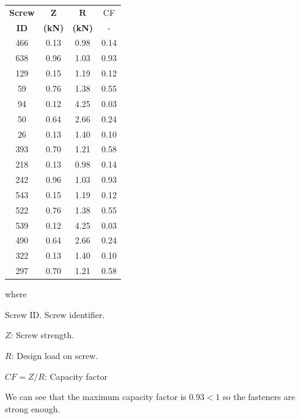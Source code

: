 \begin{center}
  \begin{tabular}{|c|c|c|c|}
    \hline
    \textbf{Screw} & $\mathbf{Z}$ & $\mathbf{R}$ & CF    \\
    \textbf{ID} & \textbf{(kN)}& \textbf{(kN)} & - \\
      \hline
466 & 0.13 & 0.98 & 0.14\\
638 & 0.96 & 1.03 & 0.93\\
129 & 0.15 & 1.19 & 0.12\\
59 & 0.76 & 1.38 & 0.55\\
94 & 0.12 & 4.25 & 0.03\\
50 & 0.64 & 2.66 & 0.24\\
26 & 0.13 & 1.40 & 0.10\\
393 & 0.70 & 1.21 & 0.58\\
218 & 0.13 & 0.98 & 0.14\\
242 & 0.96 & 1.03 & 0.93\\
543 & 0.15 & 1.19 & 0.12\\
522 & 0.76 & 1.38 & 0.55\\
539 & 0.12 & 4.25 & 0.03\\
490 & 0.64 & 2.66 & 0.24\\
322 & 0.13 & 1.40 & 0.10\\
297 & 0.70 & 1.21 & 0.58\\
\hline
  \end{tabular}
  \end{center}

\noindent where
\begin{description}
\item{Screw ID.} Screw identifier.
\item{$Z$:} Screw strength.
\item{$R$:} Design load on screw.
\item{$CF= Z/R$:} Capacity factor
  \end{description}

We can see that the maximum capacity factor is $0.93<1$ so the fasteners are strong enough.

